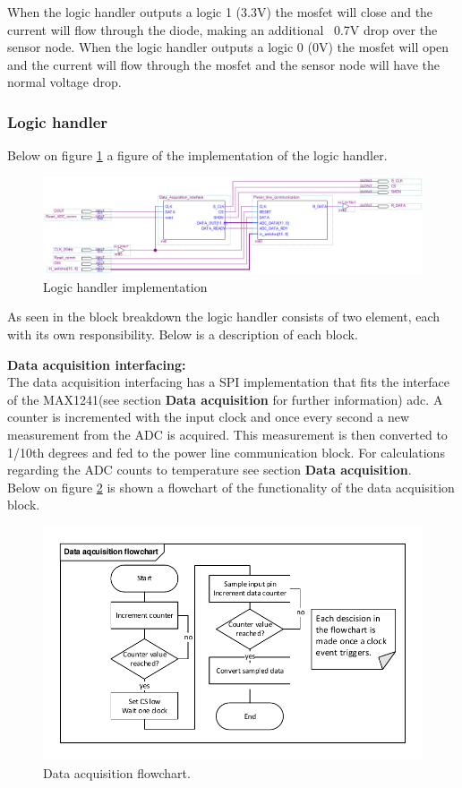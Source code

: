 When the logic handler outputs a logic 1 (3.3V) the mosfet will close and the current will flow through the diode, making an additional ~0.7V drop over the sensor node. When the logic handler outputs a logic 0 (0V) the mosfet will open and the current will flow through the mosfet and the sensor node will have the normal voltage drop.



\subsubsection{Logic handler}
Below on figure \ref{fig:logic_handler_imp} a figure of the implementation of the logic handler. 

\begin{figure}[H]
	\centering
	\includegraphics[width=1\textwidth]{billeder/logic_handler_imp}
	\caption{Logic handler implementation}
	\label{fig:logic_handler_imp}
\end{figure}

As seen in the block breakdown the logic handler consists of two element, each with its own responsibility. Below is a description of each block.

\textbf{Data acquisition interfacing:}\\
The data acquisition interfacing has a SPI implementation that fits the interface of the MAX1241(see section \textbf{Data acquisition} for further information) adc. A counter is incremented with the input clock and once every second a new measurement from the ADC is acquired. This measurement is then converted to 1/10th degrees and fed to the power line communication block. For calculations regarding the ADC counts to temperature see section \textbf{Data acquisition}.\\
Below on figure \ref{fig:data_acq} is shown a flowchart of the functionality of the data acquisition block.

\begin{figure}[H]
	\centering
	\includegraphics[width=.6\textwidth]{billeder/data_aqc_flowchart}
	\caption{Data acquisition flowchart.}
	\label{fig:data_acq}
\end{figure}

